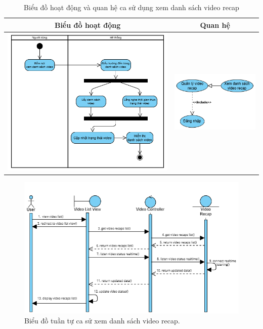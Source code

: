 \vspace{0.8cm}

\noindent 
\begin{table}[H]
\centering
\caption{Biểu đồ hoạt động và quan hệ ca sử dụng xem danh sách video recap}
\label{tab:view-video-recap-usecase-activity}
\begin{tabular}{| c | c |}
    \hline
    \textbf{Biểu đồ hoạt động} & \textbf{Quan hệ} \\ 
    \hline
    \includegraphics[width=0.6\linewidth]{figures/c3/3-3-8-activity-diagram.png} 
    &  
    \includegraphics[width=0.35\linewidth]{figures/c3/3-3-8-relationship.png} \\ 
    \hline
\end{tabular}
\end{table}

\begin{figure}[ht]
    \centering  
    \includegraphics[width=1\textwidth]{figures/c3/3-3-8-sequence-diagram.png}
    \caption{Biểu đồ tuần tự ca sử xem danh sách video recap.}
    \label{fig:3-3-8-sequence-diagram}
\end{figure}